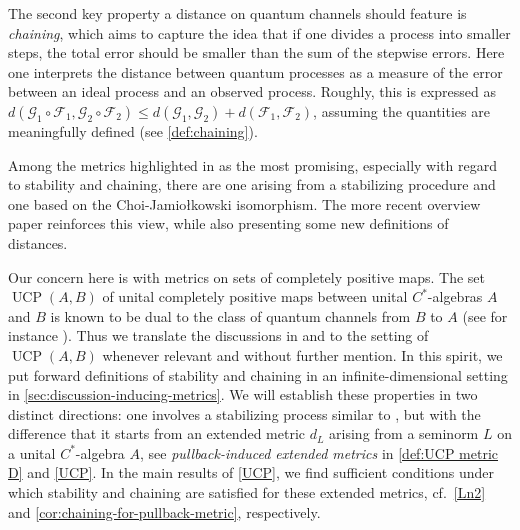 \documentclass[11pt, a4paper, oneside, final, reqno]{amsart}
\newcommand{\UCP}{\operatorname{UCP}}
\theoremstyle{definition}
\theoremstyle{plain}
\theoremstyle{remark}
\numberwithin{equation}{section}
\begin{document}
The second key property a distance on quantum channels should feature is \emph{chaining}, which aims to capture the idea that if one divides a process into smaller steps, the total error should be smaller than the sum of the stepwise errors. Here one interprets the distance between quantum processes as a measure of the error between an ideal process and an observed process. Roughly, this is expressed as $d(\mathcal{G}_1\circ \mathcal{F}_1, \mathcal{G}_2\circ \mathcal{F}_2)\leq d(\mathcal{G}_1, \mathcal{G}_2)+d(\mathcal{F}_1,\mathcal{F}_2)$, assuming the quantities are meaningfully defined (see \cref{def:chaining}).

Among the metrics highlighted in \cite{Gilchrist} as the most promising, especially with regard to stability and chaining,  there are one arising from a stabilizing procedure and one based on the Choi-Jamio\l{}kowski isomorphism. The more recent overview paper \cite{BorovykVellambi25} reinforces this view, while also presenting some new definitions of distances. 

Our concern here is with metrics on sets of completely positive maps. The set $\UCP(A, B)$ of unital completely positive maps between unital $C^*$-algebras $A$ and $B$ is known to be dual to the class of quantum channels from $B$ to $A$ (see for instance \cite{JKP2009, Wat2009}). Thus we translate the discussions in \cite{Gilchrist} and \cite{BorovykVellambi25} to the setting of $\UCP(A, B)$ whenever relevant and without further mention. 
In this spirit, we put forward definitions of stability and chaining in an infinite-dimensional setting in \cref{sec:discussion-inducing-metrics}. 
We will establish these properties in two distinct directions: one involves a stabilizing process similar to \cite{Gilchrist, BorovykVellambi25}, but with the difference that it starts from an extended metric $d_L$ arising from a  seminorm $L$ on a unital $C^*$-algebra $A$, see \emph{pullback-induced extended metrics} in \cref{def:UCP metric D} and \cref{UCP}. 
In the main results of \cref{UCP}, we
find sufficient conditions under which stability and chaining are satisfied for these extended metrics, cf.~\cref{Ln2} and \cref{cor:chaining-for-pullback-metric}, respectively. 
 
\end{document}
